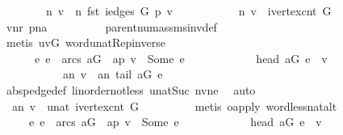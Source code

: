 \begin{isabellebody}
\ \ \ \ \ \ \ \ n\ v\ {\isacharequal}\ n\ {\isacharparenleft}fst\ {\isacharparenleft}iedges\ G\ {\isacharparenleft}p\ v{\isacharparenright}{\isacharparenright}{\isacharparenright}\ {\isacharplus}\ {}\ {\isasymand}\isanewline
\ \ \ \ \ \ \ \ n\ v\ {\isacharless}\ ivertex{\isacharunderscore}cnt\ G{\isachardoublequoteclose}\isanewline
\ \ \ \ \ \ \ \ \isamarkupfalse%
\ vnr\ pna\isanewline
\ \ \ \ \ \ \ \ \isamarkupfalse%
\ parent{\isacharunderscore}num{\isacharunderscore}assms{\isacharunderscore}inv{\isacharunderscore}def\isanewline
\ \ \ \ \ \ \ \ \isamarkupfalse%
\ {\isacharparenleft}metis\ uvG\ word{\isacharunderscore}unat{\isachardot}Rep{\isacharunderscore}inverse{\isacharparenright}\isanewline
\ \ \ \ \ \ \isamarkupfalse%
\ \isamarkupfalse%
\ {}{\isacharcolon}\isanewline
\ \ \ \ \ \ {\isachardoublequoteopen}{\isasymexists}e{\isachardot}\ e\ {\isasymin}\ arcs\ {\isacharquery}aG\ {\isasymand}\ {\isacharquery}ap\ v\ {\isacharequal}\ Some\ e\ {\isasymand}\isanewline
\ \ \ \ \ \ \ \ \ \ \ head\ {\isacharquery}aG\ e\ {\isacharequal}\ v\ {\isasymand}\isanewline
\ \ \ \ \ \ \ \ \ \ \ {\isacharquery}an\ v\ {\isacharequal}\ {\isacharquery}an\ {\isacharparenleft}tail\ {\isacharquery}aG\ e{\isacharparenright}\ {\isacharplus}\ {}{\isachardoublequoteclose}\isanewline
\ \ \ \ \ \ \ \ \isamarkupfalse%
\ abs{\isacharunderscore}pedge{\isacharunderscore}def\ linorder{\isacharunderscore}not{\isacharunderscore}less\ unatSuc{}\ nv{\isacharunderscore}ne{}\ \isamarkupfalse%
\ auto\ \isanewline
\ \ \ \ \ \isamarkupfalse%
\ {}{\isacharcolon}\ {\isachardoublequoteopen}{\isacharquery}an\ v\ {\isacharless}\ unat\ {\isacharparenleft}ivertex{\isacharunderscore}cnt\ G{\isacharparenright}{\isachardoublequoteclose}\isanewline
\ \ \ \ \ \isamarkupfalse%
\ {\isacharasterisk}\ \isamarkupfalse%
\ {\isacharparenleft}metis\ o{\isacharunderscore}apply\ word{\isacharunderscore}less{\isacharunderscore}nat{\isacharunderscore}alt{\isacharparenright}\isanewline
\ \ \ \ \ \isamarkupfalse%
\ {}\ {}\ \isamarkupfalse%
\ \isanewline
\ \ \ \ \ {\isachardoublequoteopen}{\isacharparenleft}{\isasymexists}e{\isachardot}\ e\ {\isasymin}\ arcs\ {\isacharquery}aG\ {\isasymand}\ {\isacharquery}ap\ v\ {\isacharequal}\ Some\ e\ {\isasymand}\isanewline
\ \ \ \ \ \ \ \ \ \ \ head\ {\isacharquery}aG\ e\ {\isacharequal}\ v\ {\isasymand}\isanewline

\end{isabellebody}
